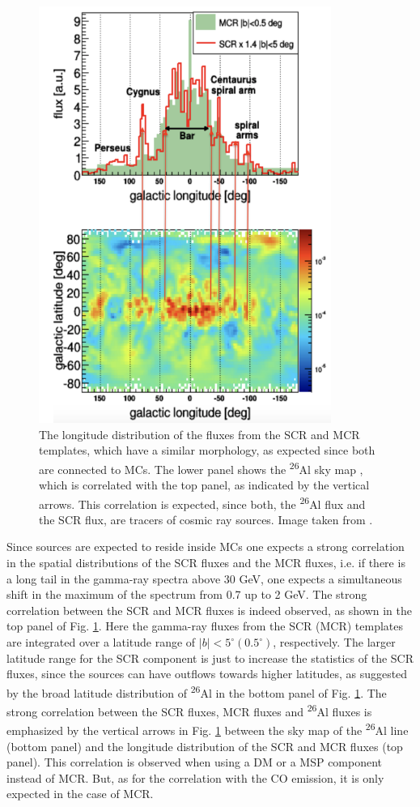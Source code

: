 \begin{figure}[H]
  \centering
  \includegraphics[width=0.5\linewidth]{pic/discussion/26Al_correlation_2.png}
  \caption[Correlation between SCR, MCR and point sources]{The longitude distribution of the fluxes from the SCR and MCR templates, which have a similar morphology, as expected since both are connected to MCs.  The lower panel shows the \textsuperscript{26}Al sky map \cite{Bouchet2015} \cite{Almap}, which is correlated with the top panel, as indicated by the vertical arrows.  This correlation is expected, since both, the \textsuperscript{26}Al flux and the SCR flux, are tracers of cosmic ray sources. Image taken from \cite{deBoer2017}.}
  \label{fig:26Al}
\end{figure}

Since sources are expected to reside inside MCs one expects a strong correlation in the spatial distributions of the SCR fluxes and the MCR fluxes, i.e. if there is a long tail in the gamma-ray spectra above 30 GeV, one expects a simultaneous shift in the maximum of the spectrum from 0.7 up to 2 GeV. The strong correlation between the SCR and MCR fluxes is indeed observed, as shown in the top panel of Fig. \ref{fig:26Al}.  Here the gamma-ray fluxes from the SCR (MCR) templates are integrated over a latitude range of $|b| < 5^\circ (0.5^\circ)$, respectively.  The larger latitude range for the SCR component is just to increase the statistics of the SCR fluxes, since the sources can have outflows towards higher latitudes, as suggested by the broad latitude distribution of \textsuperscript{26}Al in the bottom panel of Fig. \ref{fig:26Al}. The strong correlation between the SCR fluxes, MCR fluxes and \textsuperscript{26}Al fluxes is emphasized by the vertical arrows in Fig. \ref{fig:26Al} between the sky map of the \textsuperscript{26}Al line (bottom panel) and the longitude distribution  of the SCR and MCR fluxes (top panel). 
This correlation is observed when using a DM or a MSP component instead of MCR. But, as for the correlation with the CO emission, it is only expected in the case of MCR.

